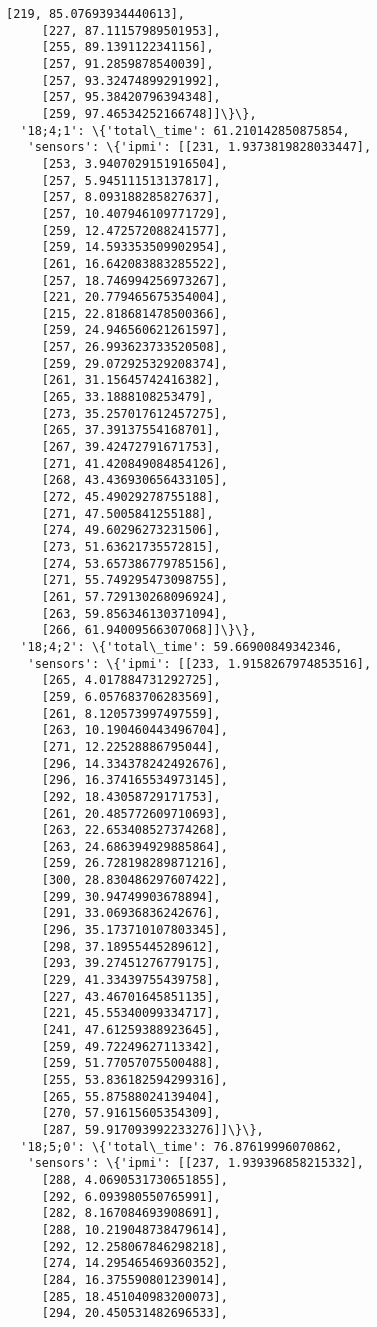 \documentclass[11pt]{article}
\begin{document}
\begin{tcolorbox}[breakable, size=fbox, boxrule=.5pt, pad at break*=1mm, opacityfill=0]
\begin{Verbatim}[commandchars=\\\{\}]
     [219, 85.07693934440613],
     [227, 87.11157989501953],
     [255, 89.1391122341156],
     [257, 91.2859878540039],
     [257, 93.32474899291992],
     [257, 95.38420796394348],
     [259, 97.46534252166748]]\}\},
  '18;4;1': \{'total\_time': 61.210142850875854,
   'sensors': \{'ipmi': [[231, 1.9373819828033447],
     [253, 3.9407029151916504],
     [257, 5.945111513137817],
     [257, 8.093188285827637],
     [257, 10.407946109771729],
     [259, 12.472572088241577],
     [259, 14.593353509902954],
     [261, 16.642083883285522],
     [257, 18.746994256973267],
     [221, 20.779465675354004],
     [215, 22.818681478500366],
     [259, 24.946560621261597],
     [257, 26.993623733520508],
     [259, 29.072925329208374],
     [261, 31.15645742416382],
     [265, 33.1888108253479],
     [273, 35.257017612457275],
     [265, 37.39137554168701],
     [267, 39.42472791671753],
     [271, 41.420849084854126],
     [268, 43.436930656433105],
     [272, 45.49029278755188],
     [271, 47.5005841255188],
     [274, 49.60296273231506],
     [273, 51.63621735572815],
     [274, 53.657386779785156],
     [271, 55.749295473098755],
     [261, 57.729130268096924],
     [263, 59.856346130371094],
     [266, 61.94009566307068]]\}\},
  '18;4;2': \{'total\_time': 59.66900849342346,
   'sensors': \{'ipmi': [[233, 1.9158267974853516],
     [265, 4.017884731292725],
     [259, 6.057683706283569],
     [261, 8.120573997497559],
     [263, 10.190460443496704],
     [271, 12.22528886795044],
     [296, 14.334378242492676],
     [296, 16.374165534973145],
     [292, 18.43058729171753],
     [261, 20.485772609710693],
     [263, 22.653408527374268],
     [263, 24.686394929885864],
     [259, 26.728198289871216],
     [300, 28.830486297607422],
     [299, 30.94749903678894],
     [291, 33.06936836242676],
     [296, 35.173710107803345],
     [298, 37.18955445289612],
     [293, 39.27451276779175],
     [229, 41.33439755439758],
     [227, 43.46701645851135],
     [221, 45.55340099334717],
     [241, 47.61259388923645],
     [259, 49.72249627113342],
     [259, 51.77057075500488],
     [255, 53.836182594299316],
     [265, 55.87588024139404],
     [270, 57.91615605354309],
     [287, 59.917093992233276]]\}\},
  '18;5;0': \{'total\_time': 76.87619996070862,
   'sensors': \{'ipmi': [[237, 1.939396858215332],
     [288, 4.0690531730651855],
     [292, 6.093980550765991],
     [282, 8.167084693908691],
     [288, 10.219048738479614],
     [292, 12.258067846298218],
     [274, 14.295465469360352],
     [284, 16.375590801239014],
     [285, 18.451040983200073],
     [294, 20.450531482696533],

\end{Verbatim}
\end{tcolorbox}
\end{document}
